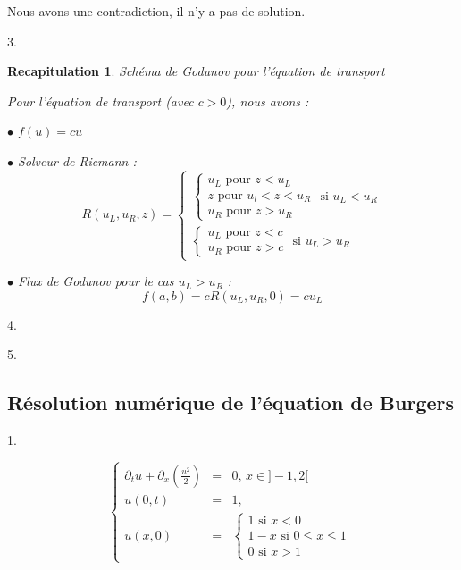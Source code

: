 \documentclass{article}
\newtheorem{recap}{Recapitulation}
\begin{document}
Nous avons une contradiction, il n'y a pas de solution.
\newline

3.

\begin{recap}{Schéma de Godunov pour l'équation de transport}

Pour l'équation de transport (avec $c>0$), nous avons :

$\bullet$ $f(u) = c u$

$\bullet$ Solveur de Riemann :
\[ R(u_L, u_R, z) = \left\{ \begin{matrix}
	
	\left\{ \begin{matrix}
		u_L \text{ pour } z < u_L \\
		z \text{ pour } u_l < z < u_R \\
		u_R \text{ pour } z > u_R	
	\end{matrix} \right. \text{ si } u_L < u_R \\
	
	\left\{ \begin{matrix} 
		u_L \text{ pour } z < c \\
		u_R \text{ pour } z > c
	\end{matrix} \right. \text{ si } u_L > u_R

	\end{matrix} \right. \]

$\bullet$ Flux de Godunov pour le cas $u_L > u_R$ :
\[ f(a,b) = c R(u_L,u_R,0) = c u_L \]

\end{recap}

4.

5.

\subsection{Résolution numérique de l’équation de Burgers}

1. 

\[ \left\{ \begin{matrix}
	\partial_t u + \partial_x(\frac{u^2}{2}) &=& 0 \textbf{, } x \in ]-1,2[ \\
	u(0,t) &=& 1, \\
	u(x,0) &=& \left\{ \begin{matrix}
		1 \text{ si } x<0 \\
		1-x \text{ si } 0\leq x \leq 1 \\
		0 \text{ si } x>1	
	\end{matrix} \right.
\end{matrix} \right.
\label{eq3} \tag{Burgers1}
\]
\end{document}
